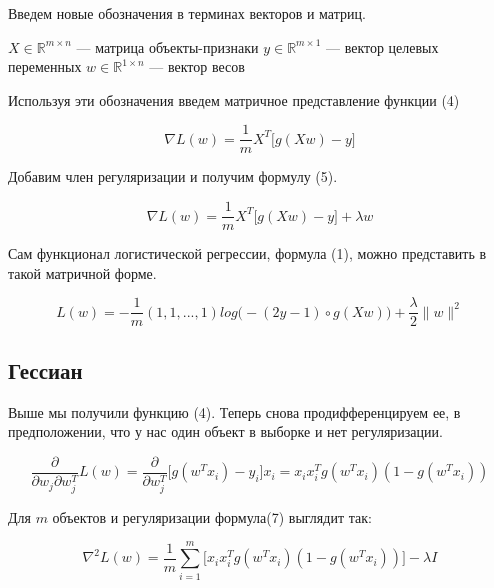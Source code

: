 \documentclass{article}
\begin{document}
	Введем новые обозначения в терминах векторов и матриц.
	
	\vspace{0.3cm}
	\begin{minipage}{0.5\textwidth}
		\begin{flushleft}
			$X \in \mathbb{R}^{m \times n} $ --- матрица объекты-признаки
			$y \in \mathbb{R}^{m \times 1} $ --- вектор целевых переменных
			$w \in \mathbb{R}^{1 \times n} $ --- вектор весов
		\end{flushleft}
	\end{minipage}

	Используя эти обозначения введем матричное представление функции (4)
	
	\begin{equation*}
		\nabla L(w) = \frac{1}{m} X^T \bigl[g(Xw) - y\bigr]
	\end{equation*}

	Добавим член регуляризации и получим формулу (5).
	
	\begin{equation}
		\nabla L(w) = \frac{1}{m} X^T \bigl[g(Xw) - y\bigr] + \lambda w
	\end{equation}
	
	Сам функционал логистической регрессии, формула (1), можно представить в такой матричной форме.
	
	\begin{equation}
		L(w) = -\frac{1}{m} (1, 1, ... , 1) log\bigl(-(2y-1) \circ g(Xw)\bigr)  + \frac{\lambda}{2} \|w\|^2
	\end{equation}

	\newpage
	\subsection{Гессиан}
	
	Выше мы получили функцию (4). Теперь снова продифференцируем ее, в предположении, что у нас один объект в выборке и нет регуляризации.
	
	\begin{equation}
		\frac{\partial}{\partial w_j \partial w_j^T} L(w) = \frac{\partial}{\partial w_j^T} \bigl[g(w^Tx_i) - y_i\bigr] x_i =  x_i x_i^T g(w^Tx_i) (1 - g(w^Tx_i))
	\end{equation}
	
	Для $m$ объектов и регуляризации формула(7) выглядит так:
	
	
	\begin{equation}
		\nabla^2 L(w) = \frac{1}{m} \sum\limits_{i=1}^m \biggl[x_i x_i^T g(w^Tx_i) (1 - g(w^Tx_i)) \biggr] - \lambda I
	\end{equation}
\end{document}
